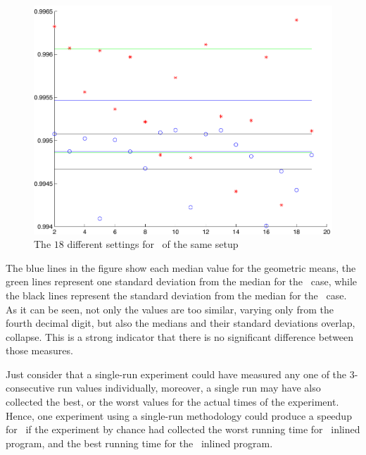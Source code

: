 \begin{figure}
  \centering
  \includegraphics[width=1.00\linewidth]{Figures/fdllrep}
  \caption{The $18$ different settings for \bzip\ of the same setup}
  \label{fig:fdllrep}
\end{figure}

The blue lines in the figure show each median value for the geometric means, the green lines represent one standard deviation from the median for the \FDI\ case, while the black lines represent the standard deviation from the median for the \llvm\ case. As it can be seen, not only the values are too similar, varying only from the fourth decimal digit, but also the medians and their standard deviations overlap, collapse. This is a strong indicator that there is no significant difference between those measures.

Just consider that a single-run experiment could have measured any one of the $3$-consecutive run values individually, moreover, a single run may have also collected the best, or the worst values for the actual times of the experiment. Hence, one experiment using a single-run methodology could produce a speedup for \FDI\ if the experiment by chance had collected the worst running time for \llvm\ inlined program, and the best running time for the \FDI\ inlined program.


